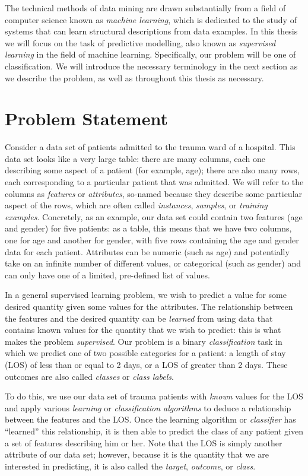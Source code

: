The technical methods of data mining are drawn substantially from a field of
computer science known as \textit{machine learning}, which is dedicated to the
study of systems that can learn structural descriptions from data examples.
In this thesis we will focus on the task of predictive modelling, also
known as \textit{supervised learning} in the field of machine learning.
Specifically,
our problem will be one of classification. We will introduce the necessary
terminology in the next section as we describe the problem, as well as
throughout this thesis as necessary.

\section{Problem Statement}
Consider a data set of patients admitted to the trauma ward of a hospital.
This data set looks like a very large table: there are many columns, each one
describing some aspect of a patient (for example, age); there are also many
rows, each corresponding to a particular patient that was admitted. We will
refer to the columns as \textit{features} or \textit{attributes}, so-named
because they describe some particular aspect of the rows, which are often
called \textit{instances}, \textit{samples}, or \textit{training examples}.
Concretely, as an example, our data set could contain
two features (age and gender) for five patients: as a table, this means that
we have two columns, one for age and another for gender, with five rows
containing the age and gender data for each patient. Attributes can be numeric
(such as age) and potentially take on an infinite number of different values,
or categorical (such as gender) and can only have one of a limited, pre-defined
list of values.

In a general supervised learning problem, we wish to predict a value for some
desired quantity given some values for the attributes. The relationship between
the features and the desired quantity can be \textit{learned} from using data
that contains known values for the quantity that we wish to predict: this is
what makes the problem \textit{supervised}.
Our problem is a binary \textit{classification} task in which we
predict one of two possible categories for a patient: a length of stay (LOS) of
less than or equal to 2 days, or a LOS of greater than 2 days. These outcomes
are also called \textit{classes} or \textit{class labels}.

To do this, we use our data set of trauma patients with \textit{known}
values for the LOS and apply various \textit{learning} or
\textit{classification algorithms} to deduce
a relationship between the features and the LOS. Once the learning algorithm
or \textit{classifier}
has ``learned'' this relationship, it is then able to predict the class of
any patient given a set of features describing him or her.
Note that the LOS is simply another attribute of our data set; however, because
it is the quantity that we are interested in predicting, it is also called the
\textit{target}, \textit{outcome}, or \textit{class}.

